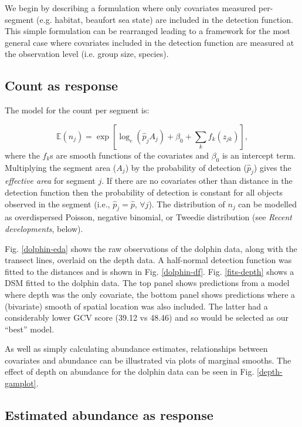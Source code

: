 \documentclass[a4paper,12pt]{article}
\begin{document}
We begin by describing a formulation where only covariates measured per-segment (e.g. habitat, beaufort sea state) are included in the detection function. This simple formulation can be rearranged leading to a framework for the most general case where covariates included in the detection function are measured at the observation level (i.e. group size, species). 

\subsection*{Count as response}

The model for the count per segment is:

\begin{equation*}
\mathbb{E}(n_j) = \exp\left[ \log_e \left( \hat{p}_j A_j \right) + \beta_0 + \sum_k f_k\left(z_{jk}\right) \right],
\end{equation*}
where the $f_k$s are smooth functions of the covariates and $\beta_0$ is an intercept term. Multiplying the segment area ($A_j$) by the probability of detection ($\hat{p}_j$) gives the \textit{effective area} for segment $j$. If there are no covariates other than distance in the detection function then the probability of detection is constant for all objects observed in the segment (i.e., $\hat{p}_j=\hat{p}$, $\forall j$). The distribution of $n_j$ can be modelled as overdispersed Poisson, negative binomial, or Tweedie distribution (see \textit{Recent developments}, below).

Fig. \ref{dolphin-eda} shows the raw observations of the dolphin data, along with the transect lines, overlaid on the depth data. A half-normal detection function was fitted to the distances and is shown in Fig. \ref{dolphin-df}. Fig. \ref{fits-depth} shows a DSM fitted to the dolphin data. The top panel shows predictions from a model where depth was the only covariate, the bottom panel shows predictions where a (bivariate) smooth of spatial location was also included. The latter had a considerably lower GCV score (39.12 vs 48.46) and so would be selected as our ``best'' model. 

As well as simply calculating abundance estimates, relationships between covariates and abundance can be illustrated via plots of marginal smooths. The effect of depth on abundance for the dolphin data can be seen in Fig. \ref{depth-gamplot}. 

\subsection*{Estimated abundance as response}
\end{document}
